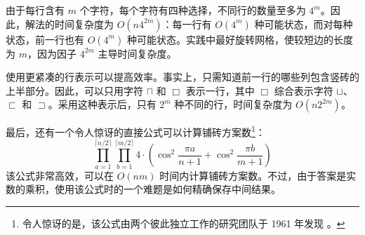 由于每行含有 $m$ 个字符，每个字符有四种选择，不同行的数量至多为 $4^m$。因此，解法的时间复杂度为 $O(n4^{2m})$：每一行有 $O(4^m)$ 种可能状态，而对每种状态，前一行也有 $O(4^m)$ 种可能状态。实践中最好旋转网格，使较短边的长度为 $m$，因为因子 $4^{2m}$ 主导时间复杂度。

使用更紧凑的行表示可以提高效率。事实上，只需知道前一行的哪些列包含竖砖的上半部分。因此，可以只用字符 $\sqcap$ 和 $\Box$ 表示一行，其中 $\Box$ 综合表示字符 $\sqcup$、$\sqsubset$ 和 $\sqsupset$。采用这种表示后，只有 $2^m$ 种不同的行，时间复杂度为 $O(n2^{2m})$。

最后，还有一个令人惊讶的直接公式可以计算铺砖方案数\footnote{令人惊讶的是，该公式由两个彼此独立工作的研究团队于 1961 年发现 \cite{kas61,tem61}。}：
\[ \prod_{a=1}^{\lceil n/2 \rceil} \prod_{b=1}^{\lceil m/2 \rceil} 4 \cdot (\cos^2 \frac{\pi a}{n + 1} + \cos^2 \frac{\pi b}{m+1})\]
该公式非常高效，可以在 $O(nm)$ 时间内计算铺砖方案数。不过，由于答案是实数的乘积，使用该公式时的一个难题是如何精确保存中间结果。
